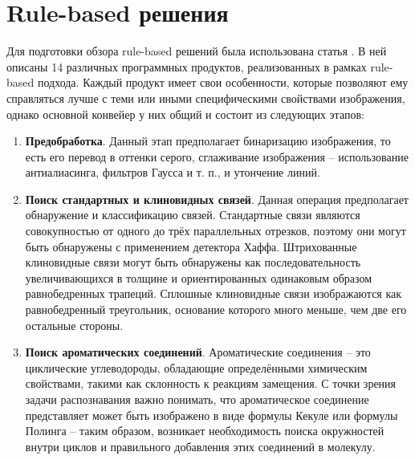 \section{Rule-based решения} \label{ch1:sec2}
Для подготовки обзора rule-based решений была использована статья \cite{rajan2020review}. В ней описаны 14 различных программных продуктов, реализованных в рамках rule-based подхода. Каждый продукт имеет свои особенности, которые позволяют ему справляться лучше с теми или иными специфическими свойствами изображения, однако основной конвейер у них общий и состоит из следующих этапов:
\begin{enumerate}[1.]
	\item \textbf{Предобработка}. Данный этап предполагает бинаризацию изображения, то есть его перевод в оттенки серого, сглаживание изображения --  использование антиалиасинга, фильтров Гаусса и т. п., и утончение линий.
    \item \textbf{Поиск стандартных и клиновидных связей}. Данная операция предполагает обнаружение и классификацию связей. Стандартные связи являются совокупностью от одного до трёх параллельных отрезков, поэтому они могут быть обнаружены с применением детектора Хаффа. Штрихованные клиновидные связи могут быть обнаружены как последовательность увеличивающихся в толщине и ориентированных одинаковым образом равнобедренных трапеций. Сплошные клиновидные связи изображаются как равнобедренный треугольник, основание которого много меньше, чем две его остальные стороны.
    \item \textbf{Поиск ароматических соединений}. Ароматические соединения -- это циклические углеводороды, обладающие определёнными химическим свойствами, такими как склонность к реакциям замещения. С точки зрения задачи распознавания важно понимать, что ароматическое соединение представляет может быть изображено в виде формулы Кекуле или формулы Полинга -- таким образом, возникает необходимость поиска окружностей внутри циклов и правильного добавления этих соединений в молекулу.
    

\end{enumerate}
